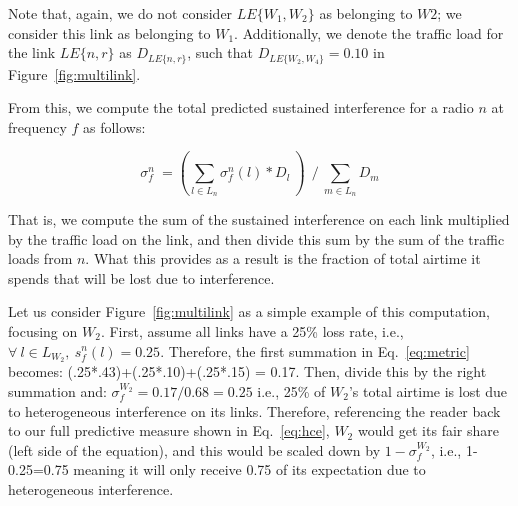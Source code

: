  \noindent Note that, again, we do not consider $LE\{W_1,W_2\}$ as belonging to $W2$; we consider this link as belonging to $W_1$.  Additionally, we denote the traffic load for the link $LE\{n,r\}$ as $D_{LE\{n,r\}}$, such that $D_{LE\{W_2,W_4\}}=0.10$ in Figure~\ref{fig:multilink}. 
 
 From this, we compute the total predicted sustained interference for a radio $n$ at frequency $f$ as follows:
 
 \vspace{-0.1in}
\begin{equation}
\label{eq:metric}
\sigma_f^n ~= (\sum\limits_{l \in L_n} \sigma^n_f(l) * D_l~) ~~/~ \sum\limits_{m \in L_n} D_m
\end{equation}
 
 \noindent That is, we compute the sum of the sustained interference on each link multiplied by the traffic load on the link, and then divide this sum by the sum of the traffic loads from $n$.   What this provides as a result is the fraction of total airtime it spends that will be lost due to interference.  
 
 Let us consider Figure~\ref{fig:multilink} as a simple example of this computation, focusing on $W_2$.  First, assume all links have a 25\% loss rate, i.e., $\forall ~l \in L_{W_2},~ s^n_f(l) = 0.25$. Therefore, the first summation in Eq.~\ref{eq:metric} becomes:  (.25*.43)+(.25*.10)+(.25*.15) = 0.17. Then, divide this by the right summation and: $\sigma^{W_2}_f = 0.17 / 0.68 = 0.25$ i.e., 25\% of $W_2$'s total airtime is lost due to heterogeneous interference on its links.  Therefore, referencing the reader back to our full predictive measure shown in Eq.~\ref{eq:hce}, $W_2$ would get its fair share (left side of the equation), and this would be scaled down by $1-\sigma^{W_2}_f$, i.e., 1-0.25=0.75 meaning it will only receive 0.75 of its expectation due to heterogeneous interference. 
 
 

